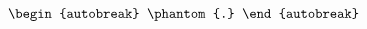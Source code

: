 \documentclass{article}
\begin{document}
\begin{align}
  \begin{autobreak}
    \phantom{.}
    
  \end{autobreak}
\end{align}
\end{document}
